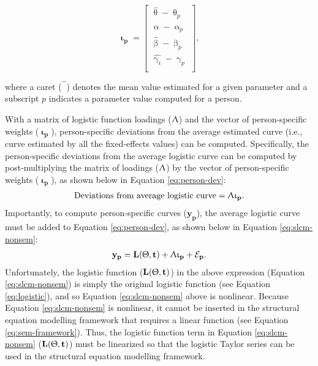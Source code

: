 \documentclass[
12pt, %
twoside,
english]{guelphthesis}
\begin{document}
\[ 
\mathbf{\upiota_p} = 
\begin{bmatrix}
\hat{\uptheta} - \uptheta_p   \\ 
\hat{\upalpha} - \upalpha_p   \\ 
\hat{\upbeta} - \upbeta_p \\ 
\hat{\upgamma_i} - \upgamma_p \\
\end{bmatrix},
\]

\noindent where a caret (\(\hat{\phantom{\beta}}\)) denotes the mean value estimated
for a given parameter and a subscript \(p\) indicates a parameter value
computed for a person.

With a matrix of logistic function loadings (\(\mathbf{\Uplambda}\)) and the vector of person-specific weights (\(\mathbf{\upiota_p}\)), person-specific deviations from the average estimated curve (i.e., curve estimated by all the fixed-effects values) can be computed. Specifically, the person-specific deviations from the average logistic curve can be computed by post-multiplying the matrix of loadings (\(\mathbf{\Uplambda}\)) by the vector of person-specific weights (\(\mathbf{\upiota_p}\)), as shown below in Equation \ref{eq:person-dev}:
\begin{align}
 \text{Deviations from average logistic curve} = \mathbf{\Uplambda\upiota_p}.
 \label{eq:person-dev}
\end{align}
\noindent Importantly, to compute person-specific curves (\(\mathbf{y_p}\)), the average logistic curve must be added to Equation \ref{eq:person-dev}, as shown below in Equation \ref{eq:slcm-nonsem}:
\begin{align}
 \mathbf{y_p} = \mathbf{L(\Uptheta, t)} + \mathbf{\Uplambda\upiota_p} + \mathbf{\mathcal{E}_p}.
 \label{eq:slcm-nonsem}
\end{align}
\noindent Unfortunately, the logistic function (\(\mathbf{L(\Uptheta, t)}\)) in the
above expression (Equation \ref{eq:slcm-nonsem}) is simply the original logistic function (see Equation \ref{eq:logistic}), and so Equation \ref{eq:slcm-nonsem} above is nonlinear. Because Equation \ref{eq:slcm-nonsem} is nonlinear, it cannot be inserted in the structural equation modelling framework that requires a linear function (see Equation \ref{eq:sem-framework}). Thus, the logistic function term in Equation \ref{eq:slcm-nonsem} (\(\mathbf{L(\Uptheta, t)}\)) must be linearized so that the logistic Taylor series can be used in the structural equation modelling framework.
\end{document}

